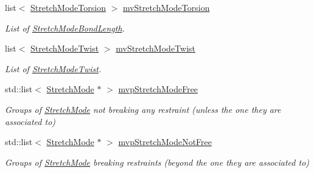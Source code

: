 \begin{DoxyCompactItemize}
list$<$ \mbox{\hyperlink{struct_obj_cryst_1_1_stretch_mode_torsion}{Stretch\+Mode\+Torsion}} $>$ \mbox{\hyperlink{class_obj_cryst_1_1_molecule_a878336f175d85a68d55804ad43a453dc}{mv\+Stretch\+Mode\+Torsion}}
\begin{DoxyCompactList}\small\item\em List of \mbox{\hyperlink{struct_obj_cryst_1_1_stretch_mode_bond_length}{Stretch\+Mode\+Bond\+Length}}. \end{DoxyCompactList}\item 
\mbox{\label{class_obj_cryst_1_1_molecule_a53def8e47e265fc3dd62af4b07997bd1}} 
list$<$ \mbox{\hyperlink{struct_obj_cryst_1_1_stretch_mode_twist}{Stretch\+Mode\+Twist}} $>$ \mbox{\hyperlink{class_obj_cryst_1_1_molecule_a53def8e47e265fc3dd62af4b07997bd1}{mv\+Stretch\+Mode\+Twist}}
\begin{DoxyCompactList}\small\item\em List of \mbox{\hyperlink{struct_obj_cryst_1_1_stretch_mode_twist}{Stretch\+Mode\+Twist}}. \end{DoxyCompactList}\item 
\mbox{\label{class_obj_cryst_1_1_molecule_a215591f48317322bb1b9203ebad4a011}} 
std\+::list$<$ \mbox{\hyperlink{struct_obj_cryst_1_1_stretch_mode}{Stretch\+Mode}} $\ast$ $>$ \mbox{\hyperlink{class_obj_cryst_1_1_molecule_a215591f48317322bb1b9203ebad4a011}{mvp\+Stretch\+Mode\+Free}}
\begin{DoxyCompactList}\small\item\em Groups of \mbox{\hyperlink{struct_obj_cryst_1_1_stretch_mode}{Stretch\+Mode}} not breaking any restraint (unless the one they are associated to) \end{DoxyCompactList}\item 
\mbox{\label{class_obj_cryst_1_1_molecule_ae87a1cece989dc3d433eb7fad925c5de}} 
std\+::list$<$ \mbox{\hyperlink{struct_obj_cryst_1_1_stretch_mode}{Stretch\+Mode}} $\ast$ $>$ \mbox{\hyperlink{class_obj_cryst_1_1_molecule_ae87a1cece989dc3d433eb7fad925c5de}{mvp\+Stretch\+Mode\+Not\+Free}}
\begin{DoxyCompactList}\small\item\em Groups of \mbox{\hyperlink{struct_obj_cryst_1_1_stretch_mode}{Stretch\+Mode}} breaking restraints (beyond the one they are associated to) \end{DoxyCompactList}\item 

\end{DoxyCompactItemize}
